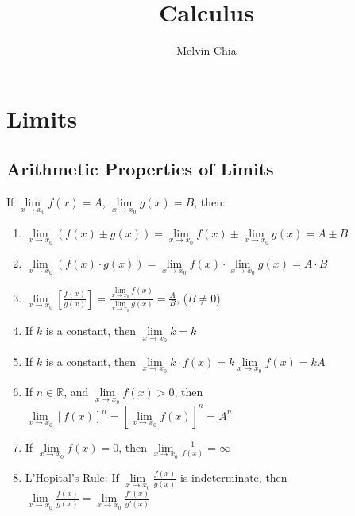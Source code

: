 \documentclass{report}
\title{Calculus}
\author{Melvin Chia}
\begin{document}
\maketitle
\tableofcontents

\chapter{Limits}

\section{Arithmetic Properties of Limits}

\begin{mdframed}
      If $\lim\limits_{x \to x_0} f(x) = A$, $\lim\limits_{x \to x_0} g(x) = B$, then:
      \begin{enumerate}[label= (\alph*)]
            \item $\lim\limits_{x \to x_0} (f(x) \pm g(x)) = \lim\limits_{x \to x_0} f(x) \pm \lim\limits_{x \to x_0} g(x) = A \pm B$
            \item $\lim\limits_{x \to x_0} (f(x) \cdot g(x)) = \lim\limits_{x \to x_0} f(x) \cdot \lim\limits_{x \to x_0} g(x) = A \cdot B$
            \item $\lim\limits_{x \to x_0} \left[\frac{f(x)}{g(x)}\right] = \frac{\lim\limits_{x \to x_0} f(x)}{\lim\limits_{x \to x_0} g(x)} = \frac{A}{B}$, ($B \neq 0$)
            \item If $k$ is a constant, then $\lim\limits_{x \to x_0} k = k$
            \item If $k$ is a constant, then $\lim\limits_{x \to x_0} k \cdot f(x) = k
                        \lim\limits_{x \to x_0} f(x) = kA$
            \item If $n \in \mathbb{R}$, and $\lim\limits_{x \to x_0} f(x) > 0$, then
                  $\lim\limits_{x \to x_0} {[f(x)]}^n = {\left[\lim\limits_{x \to
                                    x_0}f(x)\right]}^n = A^n$
            \item If $\lim\limits_{x \to x_0} f(x) = 0$, then $\lim\limits_{x \to x_0}
                        \frac{1}{f(x)} = \infty$
            \item L'Hopital's Rule: If $\lim\limits_{x \to x_0} \frac{f(x)}{g(x)}$ is
                  indeterminate, then $\lim\limits_{x \to x_0} \frac{f(x)}{g(x)} = \lim\limits_{x
                              \to x_0} \frac{f'(x)}{g'(x)}$
      \end{enumerate}
\end{mdframed}
\end{document}
